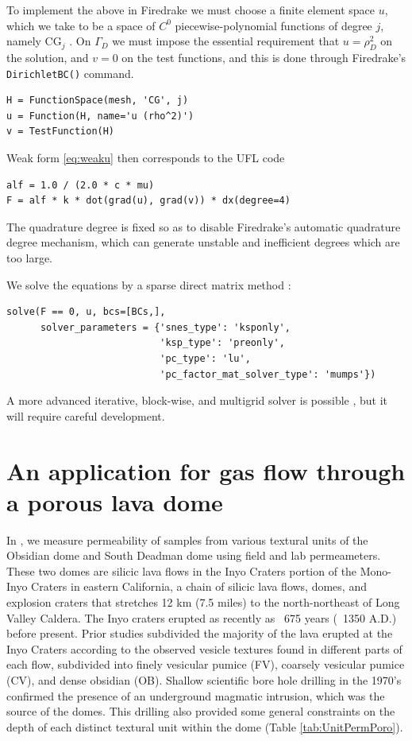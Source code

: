 \documentclass[11pt]{amsart}
\begin{document}
To implement the above in Firedrake we must choose a finite element space $u$, which we take to be a space of $C^0$ piecewise-polynomial functions of degree $j$, namely $\text{CG}_j$ \citep{Elman2014}.  On $\Gamma_D$ we must impose the essential requirement that $u=\rho_D^2$ on the solution, and $v=0$ on the test functions, and this is done through Firedrake's \verb|DirichletBC()| command.
\begin{Verbatim}[fontsize=\small,frame=lines]
H = FunctionSpace(mesh, 'CG', j)
u = Function(H, name='u (rho^2)')
v = TestFunction(H)
\end{Verbatim}
Weak form \eqref{eq:weaku} then corresponds to the UFL code
\begin{Verbatim}[fontsize=\small,frame=lines]
alf = 1.0 / (2.0 * c * mu)
F = alf * k * dot(grad(u), grad(v)) * dx(degree=4)
\end{Verbatim}
The quadrature degree is fixed so as to disable Firedrake's automatic quadrature degree mechanism, which can generate unstable and inefficient degrees which are too large.

We solve the equations by a sparse direct matrix method \citep{Amestoy2001}:
\begin{Verbatim}[fontsize=\small,frame=lines]
solve(F == 0, u, bcs=[BCs,],
      solver_parameters = {'snes_type': 'ksponly',
                           'ksp_type': 'preonly',
                           'pc_type': 'lu',
                           'pc_factor_mat_solver_type': 'mumps'})
\end{Verbatim}
A more advanced iterative, block-wise, and multigrid solver is possible \citep[e.g.][]{Bueler2021}, but it will require careful development.


\section{An application for gas flow through a porous lava dome}

In \cite{Graham2023}, we measure permeability of samples from various textural units of the Obsidian dome and South Deadman dome using field and lab permeameters. These two domes are silicic lava flows in the Inyo Craters portion of the Mono-Inyo Craters in eastern California, a chain of silicic lava flows, domes, and explosion craters that stretches 12 km (7.5 miles) to the north-northeast of Long Valley Caldera. The Inyo craters erupted as recently as ~675 years (~1350 A.D.) before present. Prior studies subdivided the majority of the lava erupted at the Inyo Craters according to the observed vesicle textures found in different parts of each flow, subdivided into finely vesicular pumice (FV), coarsely vesicular pumice (CV), and dense obsidian (OB). Shallow scientific bore hole drilling in the 1970's confirmed the presence of an underground magmatic intrusion, which was the source of the domes. This drilling also provided some general constraints on the depth of each distinct textural unit within the dome (Table \ref{tab:UnitPermPoro}).
\end{document}
